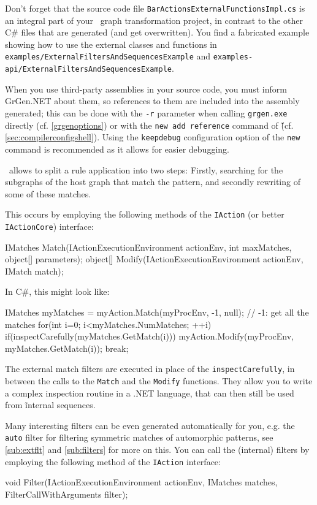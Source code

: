 \noindent Don't forget that the source code file \texttt{Bar\-Actions\-External\-Functions\-Impl.cs} is an integral part of your \GrG~graph transformation project, in contrast to the other C\# files that are generated (and get overwritten).
You find a fabricated example showing how to use the external classes and functions in \texttt{examples/External\-Filters\-And\-Sequences\-Example} and \texttt{examples-api/External\-Filters\-And\-Sequences\-Example}.

When you use third-party assemblies in your source code, you must inform GrGen.NET about them, so references to them are included into the assembly generated; this can be done with the \texttt{-r} parameter when calling \texttt{grgen.exe} directly (cf. \ref{grgenoptions}) or with the \texttt{new add reference} command of \GrShell\~(cf. \ref{sec:compilerconfigshell}). 
Using the \texttt{keepdebug} configuration option of the \texttt{new} command is recommended as it allows for easier debugging.

\begin{note}\label{note:inspect}
\LibGr\ allows to split a rule application into two steps:
Firstly, searching for the subgraphs of the host graph that match the pattern, and secondly rewriting of some of these matches. 

This occurs by employing the following methods of the \texttt{IAction} (or better \texttt{IActionCore}) interface:
\begin{csharplet}
IMatches Match(IActionExecutionEnvironment actionEnv, int maxMatches, object[] parameters);
object[] Modify(IActionExecutionEnvironment actionEnv, IMatch match);
\end{csharplet}

In C\#, this might look like:
\begin{csharplet}
IMatches myMatches = myAction.Match(myProcEnv, -1, null); // -1: get all the matches
for(int i=0; i<myMatches.NumMatches; ++i)
{
	if(inspectCarefully(myMatches.GetMatch(i)))
	{
		myAction.Modify(myProcEnv, myMatches.GetMatch(i));
		break;
	}
}
\end{csharplet}

The external match filters are executed in place of the \texttt{inspectCarefully}, in between the calls to the \texttt{Match} and the \texttt{Modify} functions.
They allow you to write a complex inspection routine in a .NET language, that can then still be used from \GrG\~ internal sequences.

Many interesting filters can be even generated automatically for you, e.g. the \texttt{auto} filter for filtering symmetric matches of automorphic patterns, see \ref{sub:extflt} and \ref{sub:filters} for more on this.
You can call the (internal) filters by employing the following method of the \texttt{IAction} interface:
\begin{csharplet}
void Filter(IActionExecutionEnvironment actionEnv, IMatches matches, FilterCallWithArguments filter);
\end{csharplet}

\end{note}


